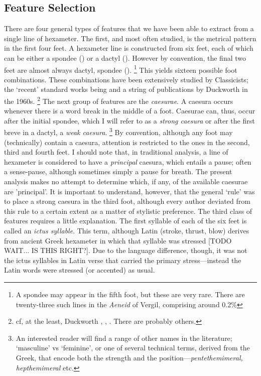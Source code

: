 \documentclass[11pt,a4paper]{scrartcl} %
\begin{document}
\subsection{Feature Selection}
There are four general types of features that we have been able to extract from a single line of hexameter. The first, and most often studied, is the metrical pattern in the first four feet. A hexameter line is constructed from six feet, each of which can be either a spondee (\metricsymbols{_ _}) or a dactyl (). However by convention, the final two feet are almost always dactyl, spondee ().%
\footnote{A spondee may appear in the fifth foot, but these are very rare. There are twenty-three such lines in the \textit{Aeneid} of Vergil, comprising around 0.2\%}
This yields sixteen possible foot combinations. These combinations have been extensively studied by Classicists; the `recent' standard works being \cite{platnauer_1951} and a string of publications by Duckworth in the 1960s.%
\footnote{cf, at the least, Duckworth \citeyear{duckworth_horaces_1965}, \citeyear{duckworth_five_1967}, \citeyear{duckworth_maphaeus_1969} \citeyear{duckworth_vergil_1969}. There are probably others.}
The next group of features are the \textit{caesurae}. A caesura occurs whenever there is a word break in the middle of a foot. Caesurae can, thus, occur after the initial spondee, which I will refer to as a \textit{strong caesura} or after the first breve in a dactyl, a \textit{weak caesura}.%
\footnote{An interested reader will find a range of other names in the literature; `masculine' vs `feminine', or one of several technical terms, derived from the Greek, that encode both the strength and the position---\textit{pentethemimeral, hepthemimeral} etc.}
By convention, although any foot may (technically) contain a caesura, attention is restricted to the ones in the second, third and fourth feet. I should note that, in traditional analysis, a line of hexameter is considered to have a \textit{principal} caesura, which entails a pause; often a sense-pause, although sometimes simply a pause for breath. The present analysis makes no attempt to determine which, if any, of the available caesurae are 'principal'. It is important to understand, however, that the general `rule' was to place a strong caesura in the third foot, although every author deviated from this rule to a certain extent as a matter of stylistic preference. The third class of features requires a little explanation. The first syllable of each of the six feet is called an \textit{ictus syllable}. This term, although Latin (stroke, thrust, blow) derives from ancient Greek hexameter in which that syllable was stressed [TODO WAIT... IS THIS RIGHT?]. Due to the language difference, though, it was not the ictus syllables in Latin verse that carried the primary stress---instead the Latin words were stressed (or accented) as usual.%
\end{document}
